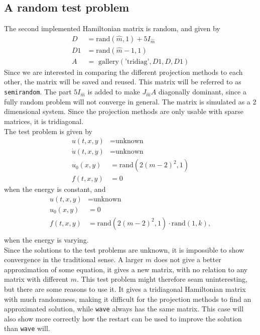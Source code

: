 \subsection{A random test problem} %
The second implemented Hamiltonian matrix is random, and given by
\begin{equation}
\begin{aligned}
D &= \text{rand}(\hat{m},1) + 5 I_{\hat{m}} \\
D1 & = \text{rand}(\hat{m}-1,1) \\
A &= \text{ gallery}(\text{'tridiag'},D1,D,D1)
\end{aligned}
\end{equation}
Since we are interested in comparing the different projection methods to each other, the matrix will be saved and reused. This matrix will be referred to as \texttt{semirandom}. The part $5 I_{\hat{m}} $ is added to make $J_{\hat{m}}A$ diagonally dominant, since a fully random problem will not converge in general. The matrix is simulated as a 2 dimensional system. Since the projection methods are only usable with sparse matrices, it is tridiagonal.\\
The test problem is given by
\begin{equation}
\begin{aligned}
u(t,x,y) &= \text{unknown} \\
\dot{u}(t,x,y) &= \text{unknown} \\
u_0(x,y) &= \text{rand} (2 (m-2)^2,1) \\
f(t,x,y) &= 0
\end{aligned}
\end{equation}
when the energy is constant, and 
\begin{equation}
\begin{aligned}
u(t,x,y) &= \text{unknown} \\
u_0(x,y) &= 0 \\
f(t,x,y) &= \text{rand} (2 (m-2)^2,1) \cdot \text{rand}(1,k), \\
\end{aligned}
\end{equation}
when the energy is varying.\\

Since the solutions to the test problems are unknown, it is impossible to show convergence in the traditional sense. A larger $m$ does not give a better approximation of some equation, it gives a new matrix, with no relation to any matrix with different $m$. This test problem might therefore seam uninteresting, but there are some reasons to use it. It gives a tridiagonal Hamiltonian matrix with much randomness, making it difficult for the projection methods to find an approximated solution, while \texttt{wave} always has the same matrix. This case will also show more correctly how the restart can be used to improve the solution than \texttt{wave} will.  \\

